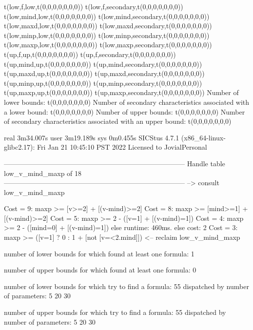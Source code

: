 t(low,f,low,t(0,0,0,0,0,0,0))
t(low,f,secondary,t(0,0,0,0,0,0,0))
t(low,mind,low,t(0,0,0,0,0,0,0))
t(low,mind,secondary,t(0,0,0,0,0,0,0))
t(low,maxd,low,t(0,0,0,0,0,0,0))
t(low,maxd,secondary,t(0,0,0,0,0,0,0))
t(low,minp,low,t(0,0,0,0,0,0,0))
t(low,minp,secondary,t(0,0,0,0,0,0,0))
t(low,maxp,low,t(0,0,0,0,0,0,0))
t(low,maxp,secondary,t(0,0,0,0,0,0,0))
t(up,f,up,t(0,0,0,0,0,0,0))
t(up,f,secondary,t(0,0,0,0,0,0,0))
t(up,mind,up,t(0,0,0,0,0,0,0))
t(up,mind,secondary,t(0,0,0,0,0,0,0))
t(up,maxd,up,t(0,0,0,0,0,0,0))
t(up,maxd,secondary,t(0,0,0,0,0,0,0))
t(up,minp,up,t(0,0,0,0,0,0,0))
t(up,minp,secondary,t(0,0,0,0,0,0,0))
t(up,maxp,up,t(0,0,0,0,0,0,0))
t(up,maxp,secondary,t(0,0,0,0,0,0,0))
Number of lower bounds:                                             t(0,0,0,0,0,0,0)
Number of secondary characteristics associated with a lower bound:  t(0,0,0,0,0,0,0)
Number of upper bounds:                                             t(0,0,0,0,0,0,0)
Number of secondary characteristics associated with an upper bound: t(0,0,0,0,0,0,0)

real	3m34.007s
user	3m19.189s
sys	0m0.455s
SICStus 4.7.1 (x86_64-linux-glibc2.17): Fri Jan 21 10:45:10 PST 2022
Licensed to JovialPersonal


--------------------------------------------------------------------------------
Handle table low_v_mind_maxp of 18
--------------------------------------------------------------------------------
--> consult low_v_mind_maxp

Cost =  9:  maxp >= [v>=2] + [(v-mind)>=2]
Cost =  8:  maxp >= [mind>=1] + [(v-mind)>=2]
Cost =  5:  maxp >= 2 - ([v=1] + [(v-mind)=1])
Cost =  4:  maxp >= 2 - ([mind=0] + [(v-mind)=1])
else runtime: 460ms. else cost: 2
Cost =  3:  maxp >= ([v=1] ? 0 : 1 + [not [v=<2.mind]]) %
<-- reclaim low_v_mind_maxp

number of lower bounds for which found at least one formula: 1

number of upper bounds for which found at least one formula: 0

number of lower bounds for which try to find a formula: 55
dispatched by number of parameters: 5  20  30

number of upper bounds for which try to find a formula: 55
dispatched by number of parameters: 5  20  30

